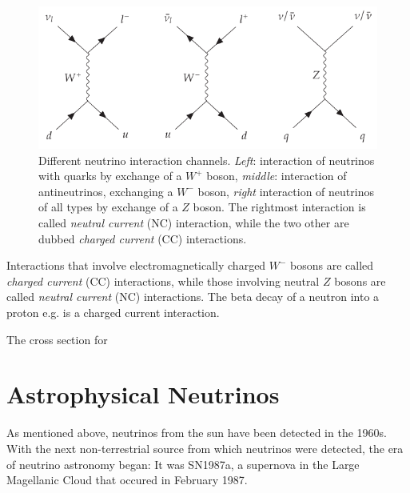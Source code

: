 \documentclass[
    a4paper, %
    fontsize=10pt, %
    twoside=false, %
    numbers=noenddot, %
    fontmethod=tex,
]{kaobook}
\begin{document}
\begin{figure}[htb]
    \includegraphics{theory/neutrino_interactions_feynman.pdf}
    \caption[Neutrino interactions]{Different neutrino interaction channels. \textit{Left}: interaction of neutrinos with quarks by exchange of a $W^+$ boson, \textit{middle}: interaction of antineutrinos, exchanging a $W^-$ boson, \textit{right} interaction of neutrinos of all types by exchange of a $Z$ boson. The rightmost interaction is called \textit{neutral current} (NC) interaction, while the two other are dubbed \textit{charged current} (CC) interactions.} 
\end{figure}

Interactions that involve electromagnetically charged $W^-$ bosons are called \textit{charged current} (CC) interactions, while those involving neutral $Z$ bosons are called \textit{neutral current} (NC) interactions. The beta decay of a neutron into a proton e.g. is a charged current interaction.

The cross section for 

\section{Astrophysical Neutrinos}
As mentioned above, neutrinos from the sun have been detected in the 1960s. With the next non-terrestrial source from which neutrinos were detected, the era of neutrino astronomy began: It was SN1987a, a supernova in the Large Magellanic Cloud that occured in February 1987. 

% 
% 
% 

\end{document}
